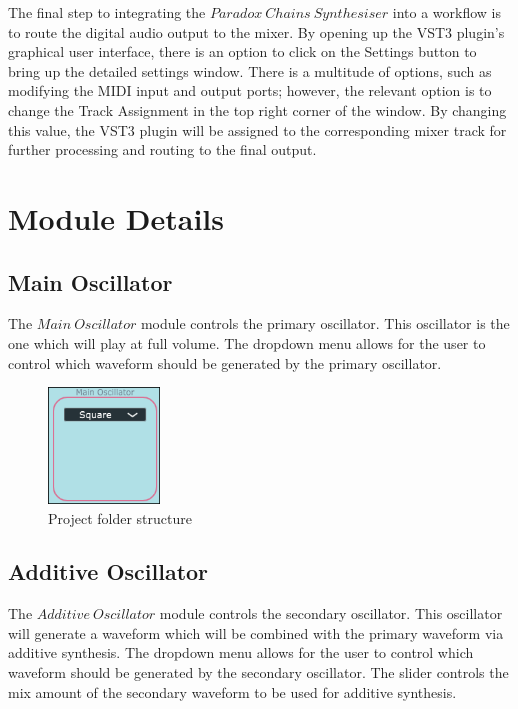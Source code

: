 \documentclass[a4paper,12pt]{report}
\begin{document}
The final step to integrating the $Paradox\ Chains\ Synthesiser$ into a workflow is to route the digital audio output to the mixer. By opening up the VST3 plugin's graphical user interface, there is an option to click on the Settings button to bring up the detailed settings window. There is a multitude of options, such as modifying the MIDI input and output ports; however, the relevant option is to change the Track Assignment in the top right corner of the window. By changing this value, the VST3 plugin will be assigned to the corresponding mixer track for further processing and routing to the final output.

\section{Module Details}
\label{sec:moduledetails}
\subsection{Main Oscillator}
\label{subsec:mainosc}
The $Main\ Oscillator$ module controls the primary oscillator. This oscillator is the one which will play at full volume. The dropdown menu allows for the user to control which waveform should be generated by the primary oscillator.

\begin{figure} \centering
\includegraphics[width=8em]{MainOscScreenshot.png}
    \caption{Project folder structure}     \label{fig:folder_structure} \end{figure}

\subsection{Additive Oscillator}
\label{subsec:addosc}
The $Additive\ Oscillator$ module controls the secondary oscillator. This oscillator will generate a waveform which will be combined with the primary waveform via additive synthesis. The dropdown menu allows for the user to control which waveform should be generated by the secondary oscillator. The slider controls the mix amount of the secondary waveform to be used for additive synthesis.
\end{document}
